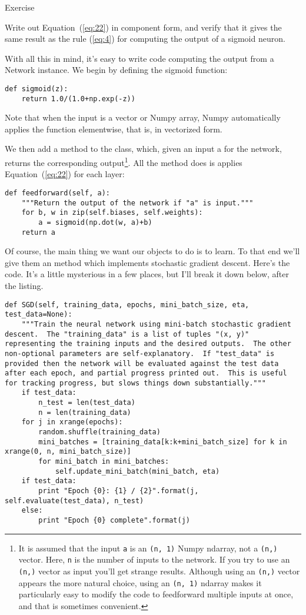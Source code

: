 \documentclass[a4paper,twoside,10pt]{book}
\begin{document}
\begin{exercize}{Exercise}
\item  Write out Equation~(\ref{eq:22}) in component form, and verify that it gives the same result as the rule (\ref{eq:4}) for computing the output of a sigmoid neuron.
\end{exercize}
With all this in mind, it's easy to write code computing the output from a Network instance. We begin by defining the sigmoid function:
\begin{lstlisting}
def sigmoid(z):
	return 1.0/(1.0+np.exp(-z))
\end{lstlisting}
Note that when the input  is a vector or Numpy array, Numpy automatically applies the function  elementwise, that is, in vectorized form.

We then add a  method to the  class, which, given an input a for the network, returns the corresponding output\footnote{It is assumed that the input \texttt{a} is an \texttt{(n, 1)} Numpy ndarray, not a \texttt{(n,)} vector. Here, \texttt{n} is the number of inputs to the network. If you try to use an \texttt{(n,)} vector as input you'll get strange results. Although using an \texttt{(n,)} vector appears the more natural choice, using an \texttt{(n, 1)} ndarray makes it particularly easy to modify the code to feedforward multiple inputs at once, and that is sometimes convenient.}. All the method does is applies Equation~(\ref{eq:22}) for each layer:
\begin{lstlisting}
def feedforward(self, a):
	"""Return the output of the network if "a" is input."""
	for b, w in zip(self.biases, self.weights):
		a = sigmoid(np.dot(w, a)+b)	
	return a
\end{lstlisting}
Of course, the main thing we want our  objects to do is to learn. To that end we'll give them an  method which implements stochastic gradient descent. Here's the code. It's a little mysterious in a few places, but I'll break it down below, after the listing.
\begin{lstlisting}
def SGD(self, training_data, epochs, mini_batch_size, eta, test_data=None):
	"""Train the neural network using mini-batch stochastic gradient descent.  The "training_data" is a list of tuples "(x, y)" representing the training inputs and the desired outputs.  The other non-optional parameters are self-explanatory.  If "test_data" is provided then the network will be evaluated against the test data after each epoch, and partial progress printed out.  This is useful for tracking progress, but slows things down substantially."""
	if test_data:
		n_test = len(test_data)
		n = len(training_data)
	for j in xrange(epochs):
		random.shuffle(training_data)
		mini_batches = [training_data[k:k+mini_batch_size] for k in xrange(0, n, mini_batch_size)]
		for mini_batch in mini_batches:
			self.update_mini_batch(mini_batch, eta)
	if test_data:
		print "Epoch {0}: {1} / {2}".format(j, self.evaluate(test_data), n_test)
	else:
		print "Epoch {0} complete".format(j)
\end{lstlisting}
\end{document}
